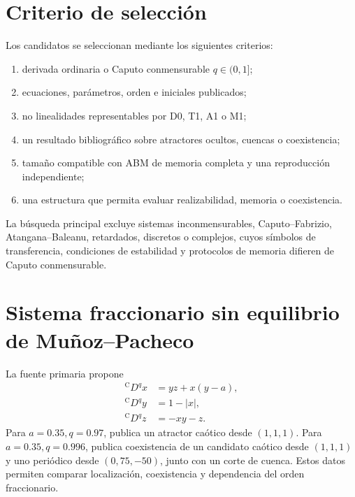 \section{Criterio de selección}
\label{sec:candidate-selection}

\HAFOCardCandidates

Los candidatos se seleccionan mediante los siguientes criterios:

\begin{enumerate}
 \item derivada ordinaria o Caputo conmensurable \(q\in(0,1]\);
 \item ecuaciones, parámetros, orden e iniciales publicados;
 \item no linealidades representables por D0, T1, A1 o M1;
 \item un resultado bibliográfico sobre atractores ocultos, cuencas o coexistencia;
 \item tamaño compatible con ABM de memoria completa y una reproducción
 independiente;
 \item una estructura que permita evaluar realizabilidad, memoria o coexistencia.
\end{enumerate}

La búsqueda principal excluye sistemas inconmensurables, Caputo--Fabrizio,
Atangana--Baleanu, retardados, discretos o complejos, cuyos símbolos de
transferencia, condiciones de estabilidad y protocolos de memoria difieren de
Caputo conmensurable.

\section[Sistema Muñoz--Pacheco sin equilibrio]
{Sistema fraccionario sin equilibrio de Muñoz--Pacheco}
\label{sec:cand-munoz}

La fuente primaria \cite{munoz2018} propone
\begin{equation}
\begin{aligned}
 {}^{\mathrm C}D^q x&=yz+x(y-a),\\
 {}^{\mathrm C}D^q y&=1-|x|,\\
 {}^{\mathrm C}D^q z&=-xy-z.
\end{aligned}
\label{eq:cand-munoz}
\end{equation}
Para \(a=0.35,q=0.97\), publica un atractor caótico desde
\((1,1,1)\). Para \(a=0.35,q=0.996\), publica coexistencia de un candidato
caótico desde \((1,1,1)\) y uno periódico desde \((0,75,-50)\), junto con un
corte de cuenca. Estos datos permiten comparar localización, coexistencia y
dependencia del orden fraccionario.

